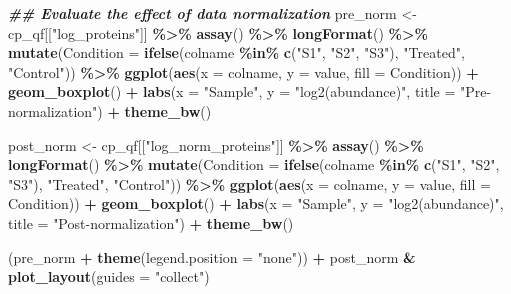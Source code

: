 \documentclass[9pt,a4paper,]{extarticle}
\newenvironment{Shaded}{\begin{snugshade}}{\end{snugshade}}
\newcommand{\AttributeTok}[1]{\textcolor[rgb]{0.13,0.29,0.53}{#1}}
\newcommand{\DocumentationTok}[1]{\textcolor[rgb]{0.56,0.35,0.01}{\textbf{\textit{#1}}}}
\newcommand{\FunctionTok}[1]{\textcolor[rgb]{0.13,0.29,0.53}{\textbf{#1}}}
\newcommand{\NormalTok}[1]{#1}
\newcommand{\OtherTok}[1]{\textcolor[rgb]{0.56,0.35,0.01}{#1}}
\newcommand{\SpecialCharTok}[1]{\textcolor[rgb]{0.81,0.36,0.00}{\textbf{#1}}}
\newcommand{\StringTok}[1]{\textcolor[rgb]{0.31,0.60,0.02}{#1}}
\begin{document}
\begin{Shaded}
\begin{Highlighting}[]
\DocumentationTok{\#\# Evaluate the effect of data normalization}
\NormalTok{pre\_norm }\OtherTok{\textless{}{-}}\NormalTok{ cp\_qf[[}\StringTok{"log\_proteins"}\NormalTok{]] }\SpecialCharTok{\%\textgreater{}\%}
  \FunctionTok{assay}\NormalTok{() }\SpecialCharTok{\%\textgreater{}\%}
  \FunctionTok{longFormat}\NormalTok{() }\SpecialCharTok{\%\textgreater{}\%}
  \FunctionTok{mutate}\NormalTok{(}\AttributeTok{Condition =} \FunctionTok{ifelse}\NormalTok{(colname }\SpecialCharTok{\%in\%} \FunctionTok{c}\NormalTok{(}\StringTok{"S1"}\NormalTok{, }\StringTok{"S2"}\NormalTok{, }\StringTok{"S3"}\NormalTok{),}
                            \StringTok{"Treated"}\NormalTok{, }\StringTok{"Control"}\NormalTok{)) }\SpecialCharTok{\%\textgreater{}\%}
  \FunctionTok{ggplot}\NormalTok{(}\FunctionTok{aes}\NormalTok{(}\AttributeTok{x =}\NormalTok{ colname, }\AttributeTok{y =}\NormalTok{ value, }\AttributeTok{fill =}\NormalTok{ Condition)) }\SpecialCharTok{+}
  \FunctionTok{geom\_boxplot}\NormalTok{() }\SpecialCharTok{+}
  \FunctionTok{labs}\NormalTok{(}\AttributeTok{x =} \StringTok{"Sample"}\NormalTok{, }\AttributeTok{y =} \StringTok{"log2(abundance)"}\NormalTok{, }\AttributeTok{title =} \StringTok{"Pre{-}normalization"}\NormalTok{) }\SpecialCharTok{+}
  \FunctionTok{theme\_bw}\NormalTok{()}

\NormalTok{post\_norm }\OtherTok{\textless{}{-}}\NormalTok{ cp\_qf[[}\StringTok{"log\_norm\_proteins"}\NormalTok{]] }\SpecialCharTok{\%\textgreater{}\%}
  \FunctionTok{assay}\NormalTok{() }\SpecialCharTok{\%\textgreater{}\%}
  \FunctionTok{longFormat}\NormalTok{() }\SpecialCharTok{\%\textgreater{}\%}
  \FunctionTok{mutate}\NormalTok{(}\AttributeTok{Condition =} \FunctionTok{ifelse}\NormalTok{(colname }\SpecialCharTok{\%in\%} \FunctionTok{c}\NormalTok{(}\StringTok{"S1"}\NormalTok{, }\StringTok{"S2"}\NormalTok{, }\StringTok{"S3"}\NormalTok{),}
                            \StringTok{"Treated"}\NormalTok{, }\StringTok{"Control"}\NormalTok{)) }\SpecialCharTok{\%\textgreater{}\%}
  \FunctionTok{ggplot}\NormalTok{(}\FunctionTok{aes}\NormalTok{(}\AttributeTok{x =}\NormalTok{ colname, }\AttributeTok{y =}\NormalTok{ value, }\AttributeTok{fill =}\NormalTok{ Condition)) }\SpecialCharTok{+}
  \FunctionTok{geom\_boxplot}\NormalTok{() }\SpecialCharTok{+}
  \FunctionTok{labs}\NormalTok{(}\AttributeTok{x =} \StringTok{"Sample"}\NormalTok{, }\AttributeTok{y =} \StringTok{"log2(abundance)"}\NormalTok{, }\AttributeTok{title =} \StringTok{"Post{-}normalization"}\NormalTok{) }\SpecialCharTok{+}
  \FunctionTok{theme\_bw}\NormalTok{()}

\NormalTok{(pre\_norm }\SpecialCharTok{+} \FunctionTok{theme}\NormalTok{(}\AttributeTok{legend.position =} \StringTok{"none"}\NormalTok{)) }\SpecialCharTok{+} 
\NormalTok{  post\_norm }\SpecialCharTok{\&} \FunctionTok{plot\_layout}\NormalTok{(}\AttributeTok{guides =} \StringTok{"collect"}\NormalTok{)}
\end{Highlighting}
\end{Shaded}
\end{document}

